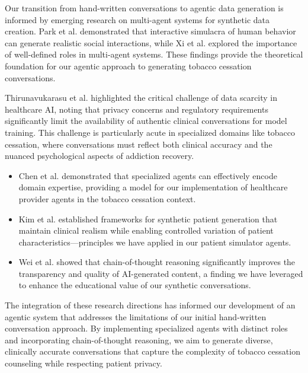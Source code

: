 Our transition from hand-written conversations to agentic data generation is informed by emerging research on multi-agent systems for synthetic data creation. Park et al. \cite{MultiAgentSystems} demonstrated that interactive simulacra of human behavior can generate realistic social interactions, while Xi et al. \cite{AgentRoles} explored the importance of well-defined roles in multi-agent systems. These findings provide the theoretical foundation for our agentic approach to generating tobacco cessation conversations.

Thirunavukarasu et al. \cite{HealthcareDataChallenges} highlighted the critical challenge of data scarcity in healthcare AI, noting that privacy concerns and regulatory requirements significantly limit the availability of authentic clinical conversations for model training. This challenge is particularly acute in specialized domains like tobacco cessation, where conversations must reflect both clinical accuracy and the nuanced psychological aspects of addiction recovery.

\begin{itemize}[label=$\bullet$, leftmargin=1cm, itemsep=0.2cm]
\item Chen et al. \cite{DomainExpertAgents} demonstrated that specialized agents can effectively encode domain expertise, providing a model for our implementation of healthcare provider agents in the tobacco cessation context.

\item Kim et al. \cite{PatientSimulation} established frameworks for synthetic patient generation that maintain clinical realism while enabling controlled variation of patient characteristics—principles we have applied in our patient simulator agents.

\item Wei et al. \cite{ChainOfThought} showed that chain-of-thought reasoning significantly improves the transparency and quality of AI-generated content, a finding we have leveraged to enhance the educational value of our synthetic conversations.
\end{itemize}

The integration of these research directions has informed our development of an agentic system that addresses the limitations of our initial hand-written conversation approach. By implementing specialized agents with distinct roles and incorporating chain-of-thought reasoning, we aim to generate diverse, clinically accurate conversations that capture the complexity of tobacco cessation counseling while respecting patient privacy.

